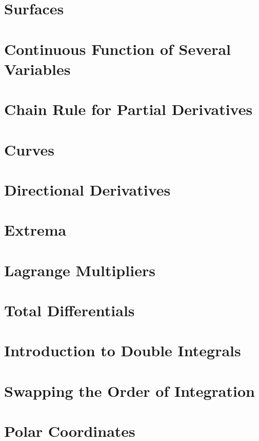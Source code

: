 \documentclass{article}
\begin{document}
\section{Surfaces}
\section{Continuous Function of Several Variables}
\section{Chain Rule for Partial Derivatives}
\section{Curves}                  %


\section{Directional Derivatives} %

\section{Extrema}                 %

\section{Lagrange Multipliers}
\section{Total Differentials}



\section{Introduction to Double Integrals}
\section{Swapping the Order of Integration}
\section{Polar Coordinates}

\end{document}
